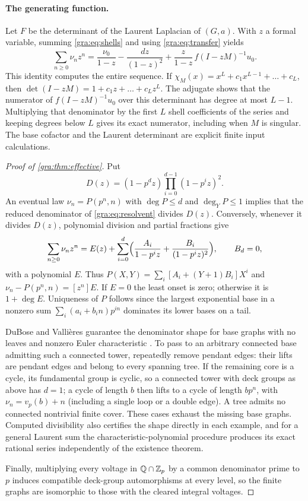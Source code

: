 \paragraph{The generating function.}
Let $F$ be the determinant of the Laurent Laplacian of $(G,a)$. With $z$ a
formal variable, summing \eqref{gra:eq:shells} and using
\eqref{gra:eq:transfer} yields
\begin{equation}\label{gra:eq:resolvent}
 \sum_{n\ge0}\nu_nz^n=\frac{\nu_0}{1-z}-\frac{dz}{(1-z)^2}
 +\frac z{1-z}\,f(I-zM)^{-1}u_0 .
\end{equation}
This identity computes the entire sequence. If
$\chi_M(x)=x^L+c_1x^{L-1}+\dots+c_L$, then
$\det(I-zM)=1+c_1z+\dots+c_Lz^L$. The adjugate shows that the numerator of
$f(I-zM)^{-1}u_0$ over this determinant has degree at most $L-1$.
Multiplying that denominator by the first $L$ shell coefficients of the
series and keeping degrees below $L$ gives its exact numerator, including
when $M$ is singular. The base cofactor and the Laurent determinant are
explicit finite input calculations.

\begin{proof}[Proof of \cref{gra:thm:effective}]
Put
\[
 D(z)=(1-p^dz)\prod_{i=0}^{d-1}(1-p^iz)^2 .
\]
An eventual law $\nu_n=P(p^n,n)$ with $\deg P\le d$ and $\deg_YP\le1$
implies that the reduced denominator of \eqref{gra:eq:resolvent} divides
$D(z)$. Conversely, whenever it divides $D(z)$, polynomial division and
partial fractions give
\[
 \sum_{n\ge0}\nu_nz^n=E(z)+\sum_{i=0}^d\Bigl(\frac{A_i}{1-p^iz}
 +\frac{B_i}{(1-p^iz)^2}\Bigr),\qquad B_d=0,
\]
with a polynomial $E$. Thus $P(X,Y)=\sum_i[A_i+(Y+1)B_i]X^i$ and
$\nu_n-P(p^n,n)=[z^n]E$. If $E=0$ the least onset is zero; otherwise it is
$1+\deg E$. Uniqueness of $P$ follows since the largest exponential base in
a nonzero sum $\sum_i(a_i+b_in)p^{in}$ dominates its lower bases on a tail.

DuBose and Valli\`eres guarantee the denominator shape for base graphs with
no leaves and nonzero Euler characteristic
\cite[Theorem~6.2]{DuBoseVallieres2023Towers}. To pass to an arbitrary
connected base admitting such a connected tower, repeatedly remove pendant
edges: their lifts are pendant edges and belong to every spanning tree. If
the remaining core is a cycle, its fundamental group is cyclic, so a
connected tower with deck groups as above has $d=1$; a cycle of length $b$
then lifts to a cycle of length $bp^n$, with $\nu_n=v_p(b)+n$ (including a
single loop or a double edge). A tree admits no connected nontrivial finite
cover. These cases exhaust the missing base graphs. Computed divisibility
also certifies the shape directly in each example, and for a general
Laurent sum the characteristic-polynomial procedure produces its exact
rational series independently of the existence theorem.

Finally, multiplying every voltage in $\mathbb{Q}\cap\mathbb{Z}_p$ by a common denominator
prime to $p$ induces compatible deck-group automorphisms at every level, so
the finite graphs are isomorphic to those with the cleared integral
voltages.
\end{proof}

